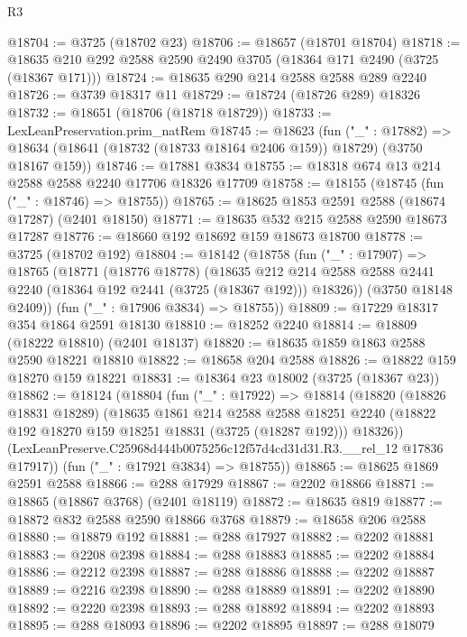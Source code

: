 \begin{lexlean}{R3}
\begin{coremodule}
@18704 := @3725 (@18702 @23)
@18706 := @18657 (@18701 @18704)
@18718 := @18635 @210 @292 @2588 @2590 @2490 @3705 (@18364 @171 @2490 (@3725 (@18367 @171)))
@18724 := @18635 @290 @214 @2588 @2588 @289 @2240
@18726 := @3739 @18317 @11
@18729 := @18724 (@18726 @289) @18326
@18732 := @18651 (@18706 (@18718 @18729))
@18733 := LexLeanPreservation.prim_natRem
@18745 := @18623
    (fun ("_" : @17882) =>
    @18634 (@18641 (@18732 (@18733 @18164 @2406 @159)) @18729) (@3750 @18167 @159))
@18746 := @17881 @3834
@18755 := @18318 @674 @13 @214 @2588 @2588 @2240 @17706 @18326 @17709
@18758 := @18155 (@18745 (fun ("_" : @18746) => @18755))
@18765 := @18625 @1853 @2591 @2588 (@18674 @17287) (@2401 @18150)
@18771 := @18635 @532 @215 @2588 @2590 @18673 @17287
@18776 := @18660 @192 @18692 @159 @18673 @18700
@18778 := @3725 (@18702 @192)
@18804 := @18142
    (@18758
      (fun ("_" : @17907) =>
      @18765
        (@18771
          (@18776 @18778)
          (@18635
            @212
            @214
            @2588
            @2588
            @2441
            @2240
            (@18364 @192 @2441 (@3725 (@18367 @192)))
            @18326))
        (@3750 @18148 @2409))
      (fun ("_" : @17906 @3834) => @18755))
@18809 := @17229 @18317 @354 @1864 @2591 @18130
@18810 := @18252 @2240
@18814 := @18809 (@18222 @18810) (@2401 @18137)
@18820 := @18635 @1859 @1863 @2588 @2590 @18221 @18810
@18822 := @18658 @204 @2588
@18826 := @18822 @159 @18270 @159 @18221
@18831 := @18364 @23 @18002 (@3725 (@18367 @23))
@18862 := @18124
    (@18804
      (fun ("_" : @17922) =>
      @18814
        (@18820
          (@18826 @18831 @18289)
          (@18635
            @1861
            @214
            @2588
            @2588
            @18251
            @2240
            (@18822 @192 @18270 @159 @18251 @18831 (@3725 (@18287 @192)))
            @18326))
        (LexLeanPreserve.C25968d444b0075256c12f57d4cd31d31.R3.__rel_12 @17836 @17917))
      (fun ("_" : @17921 @3834) => @18755))
@18865 := @18625 @1869 @2591 @2588
@18866 := @288 @17929
@18867 := @2202 @18866
@18871 := @18865 (@18867 @3768) (@2401 @18119)
@18872 := @18635 @819
@18877 := @18872 @832 @2588 @2590 @18866 @3768
@18879 := @18658 @206 @2588
@18880 := @18879 @192
@18881 := @288 @17927
@18882 := @2202 @18881
@18883 := @2208 @2398
@18884 := @288 @18883
@18885 := @2202 @18884
@18886 := @2212 @2398
@18887 := @288 @18886
@18888 := @2202 @18887
@18889 := @2216 @2398
@18890 := @288 @18889
@18891 := @2202 @18890
@18892 := @2220 @2398
@18893 := @288 @18892
@18894 := @2202 @18893
@18895 := @288 @18093
@18896 := @2202 @18895
@18897 := @288 @18079

\end{coremodule}
\end{lexlean}
